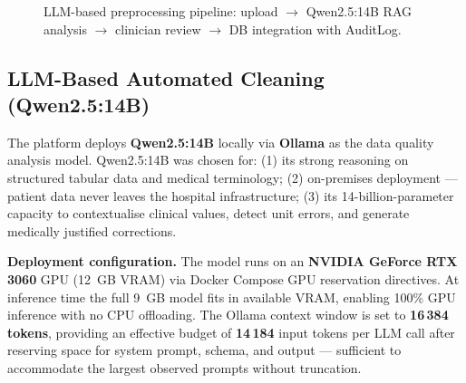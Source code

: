 \documentclass[12pt,a4paper,twoside]{report}
\begin{document}
\begin{figure}[htbp]
\caption{LLM-based preprocessing pipeline: upload $\to$ Qwen2.5:14B RAG analysis $\to$ clinician review $\to$ DB integration with AuditLog.}
\label{fig:llm_pipeline}
\end{figure}

\subsection{LLM-Based Automated Cleaning (Qwen2.5:14B)}

The platform deploys \textbf{Qwen2.5:14B} \cite{llm_clinical_nlp_2023} locally via \textbf{Ollama} as the data quality analysis model. Qwen2.5:14B was chosen for: (1) its strong reasoning on structured tabular data and medical terminology; (2) on-premises deployment — patient data never leaves the hospital infrastructure; (3) its 14-billion-parameter capacity to contextualise clinical values, detect unit errors, and generate medically justified corrections.

\textbf{Deployment configuration.} The model runs on an \textbf{NVIDIA GeForce RTX 3060} GPU (12~GB VRAM) via Docker Compose GPU reservation directives. At inference time the full 9~GB model fits in available VRAM, enabling 100\% GPU inference with no CPU offloading. The Ollama context window is set to \textbf{16\,384 tokens}, providing an effective budget of \textbf{14\,184} input tokens per LLM call after reserving space for system prompt, schema, and output — sufficient to accommodate the largest observed prompts without truncation.
\end{document}
